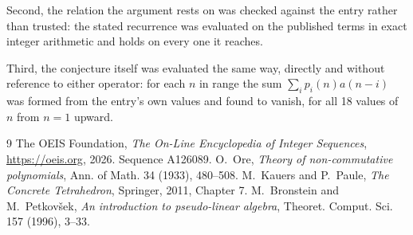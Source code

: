 \documentclass[11pt,a4paper]{article}
\theoremstyle{plain}
\theoremstyle{definition}
\begin{document}
Second, the relation the argument rests on was checked against the entry rather than
trusted: the stated recurrence was evaluated on the published terms in exact integer
arithmetic and holds on every one it reaches.

Third, the conjecture itself was evaluated the same way, directly and without reference to
either operator: for each $n$ in range the sum $\sum_{i}p_{i}(n)a(n-i)$ was formed from the
entry's own values and found to vanish, for all 18 values of $n$ from
$n=1$ upward.

\begin{thebibliography}{9}
 The OEIS Foundation, \emph{The On-Line Encyclopedia of Integer Sequences},
\url{https://oeis.org}, 2026. Sequence A126089.
 O.~Ore, \emph{Theory of non-commutative polynomials}, Ann. of Math. 34
(1933), 480--508.
 M.~Kauers and P.~Paule, \emph{The Concrete Tetrahedron}, Springer, 2011,
Chapter 7.
 M.~Bronstein and M.~Petkov\v{s}ek, \emph{An introduction to
pseudo-linear algebra}, Theoret. Comput. Sci. 157 (1996), 3--33.
\end{thebibliography}
\end{document}
